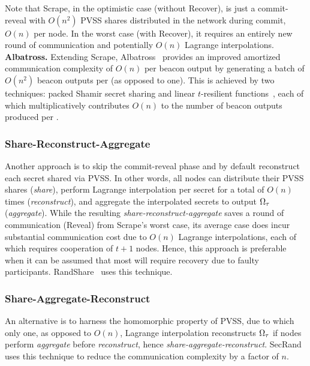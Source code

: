 Note that Scrape, in the optimistic case (without Recover), is just a commit-reveal with $O(n^2)$ PVSS shares distributed in the network during commit, $O(n)$ per node. In the worst case (with Recover), it requires an entirely new round of communication and potentially $O(n)$ Lagrange interpolations.\\

\noindent\textbf{Albatross.} Extending Scrape, Albatross~\cite{cascudo2020albatross} provides an improved amortized communication complexity of $O(n)$ per beacon output by generating a batch of $O(n^2)$ beacon outputs per \epoch (as opposed to one). This is achieved by two techniques: packed Shamir secret sharing and linear $t$-resilient functions~\cite{cascudo2020albatross}, each of which multiplicatively contributes $O(n)$ to the number of beacon outputs produced per \epoch.

\subsubsection{Share-Reconstruct-Aggregate}
Another approach is to skip the commit-reveal phase and by default reconstruct each secret shared via PVSS. In other words, all nodes can distribute their PVSS shares (\textit{share}), perform Lagrange interpolation per secret for a total of $O(n)$ times (\textit{reconstruct}), and aggregate the interpolated secrets to output $\Omega_\tau$ (\textit{aggregate}). While the resulting \textit{share-reconstruct-aggregate} saves a round of communication (Reveal) from Scrape's worst case, its average case does incur substantial communication cost due to $O(n)$ Lagrange interpolations, each of which requires cooperation of $t + 1$ nodes. Hence, this approach is preferable when it can be assumed that most \epochs will require recovery due to faulty participants. RandShare~\cite{syta2017scalable} uses this technique.

\subsubsection{Share-Aggregate-Reconstruct}
An alternative is to harness the homomorphic property of PVSS, due to which only one, as opposed to $O(n)$, Lagrange interpolation reconstructs $\Omega_\tau$ if nodes perform \textit{aggregate} before \textit{reconstruct}, hence \textit{share-aggregate-reconstruct}. SecRand~\cite{guo2020secRand} uses this technique to reduce the communication complexity by a factor of $n$.

